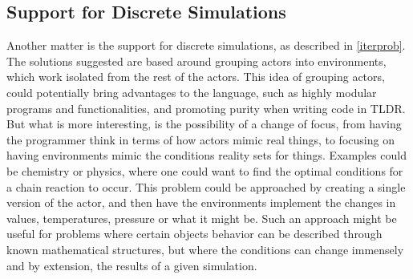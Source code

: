 \subsection{Support for Discrete Simulations}

Another matter is the support for discrete simulations, as described in \cref{iterprob}. The solutions suggested are based around grouping actors into environments, which work isolated from the rest of the actors. This idea of grouping actors, could potentially bring advantages to the language, such as highly modular programs and functionalities, and promoting purity when writing code in TLDR. But what is more interesting, is the possibility of a change of focus, from having the programmer think in terms of how actors mimic real things, to focusing on having environments mimic the conditions reality sets for things. Examples could be chemistry or physics, where one could want to find the optimal conditions for a chain reaction to occur. This problem could be approached by creating a single version of the actor, and then have the environments implement the changes in values, temperatures, pressure or what it might be. Such an approach might be useful for problems where certain objects behavior can be described through known mathematical structures, but where the conditions can change immensely and by extension, the results of a given simulation.
